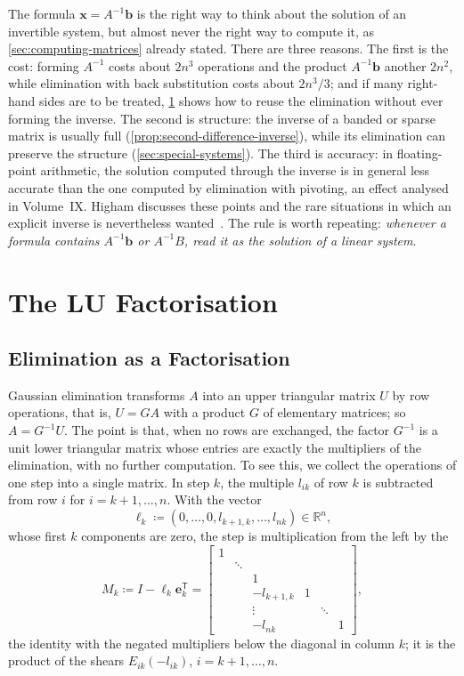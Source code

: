 The formula $\mathbf x=A^{-1}\mathbf b$ is the right way to think about the solution of an invertible system, but almost never the right way to compute it, as \cref{sec:computing-matrices} already stated. There are three reasons. The first is the cost: forming $A^{-1}$ costs about $2n^3$ operations and the product $A^{-1}\mathbf b$ another $2n^2$, while elimination with back substitution costs about $2n^3/3$; and if many right-hand sides are to be treated, \cref{sec:lu} shows how to reuse the elimination without ever forming the inverse. The second is structure: the inverse of a banded or sparse matrix is usually full (\cref{prop:second-difference-inverse}), while its elimination can preserve the structure (\cref{sec:special-systems}). The third is accuracy: in floating-point arithmetic, the solution computed through the inverse is in general less accurate than the one computed by elimination with pivoting, an effect analysed in Volume~IX. Higham discusses these points and the rare situations in which an explicit inverse is nevertheless wanted~\cite[Chap.~14]{higham2002accuracy}. The rule is worth repeating: \emph{whenever a formula contains $A^{-1}\mathbf b$ or $A^{-1}B$, read it as the solution of a linear system}.
\section{The LU Factorisation}
\label{sec:lu}

\subsection{Elimination as a Factorisation}

Gaussian elimination transforms $A$ into an upper triangular matrix $U$ by row operations, that is, $U=GA$ with a product $G$ of elementary matrices; so $A=G^{-1}U$. The point is that, when no rows are exchanged, the factor $G^{-1}$ is a unit lower triangular matrix whose entries are exactly the multipliers of the elimination, with no further computation. To see this, we collect the operations of one step into a single matrix. In step $k$, the multiple $l_{ik}$ of row $k$ is subtracted from row $i$ for $i=k+1,\ldots,n$. With the vector
\[
\boldsymbol\ell_k\coloneqq(0,\ldots,0,l_{k+1,k},\ldots,l_{nk})\in\mathbb R^n,
\]
whose first $k$ components are zero, the step is multiplication from the left by the 
\[
M_k\coloneqq I-\boldsymbol\ell_k\mathbf e_k^{\mathsf T}=\begin{bmatrix}1&&&&&\\&\ddots&&&&\\&&1&&&\\&&-l_{k+1,k}&1&&\\&&\vdots&&\ddots&\\&&-l_{nk}&&&1\end{bmatrix},
\]
the identity with the negated multipliers below the diagonal in column $k$; it is the product of the shears $E_{ik}(-l_{ik})$, $i=k+1,\ldots,n$.

